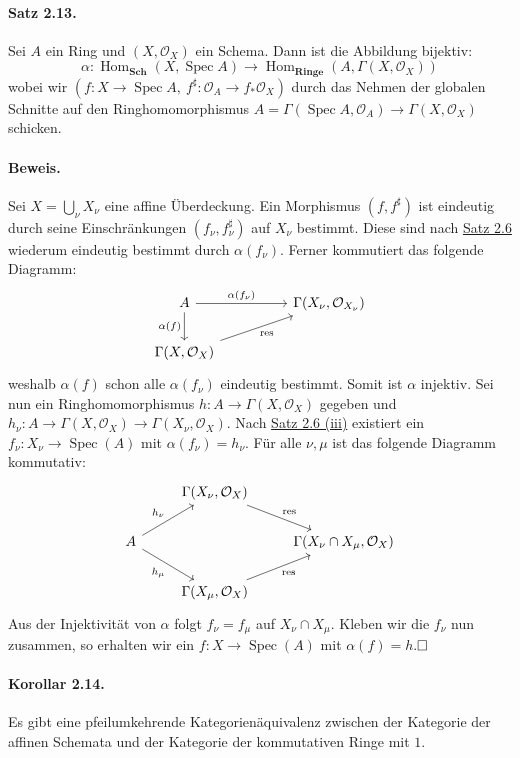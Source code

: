 \documentclass[11pt,b5paper,openany]{memoir}
\def \qed {$\hfill\square$}
\begin{document}
\paragraph{Satz 2.13.}\label{2.13} Sei $A$ ein Ring und $(X,\mathcal{O}_X)$ ein Schema. Dann ist die Abbildung bijektiv:
\[\alpha:\operatorname{Hom}_\mathbf{Sch}(X,\operatorname{Spec}A)\to \operatorname{Hom}_\textbf{Ringe}(A,\Gamma(X,\mathcal{O}_X)) \]
wobei wir $(f:X\to\operatorname{Spec}A ,\ f^\sharp:\mathcal{O}_A\to f_\ast\mathcal{O}_X)$ durch das Nehmen der globalen Schnitte auf den Ringhomomorphismus $A=\Gamma(\operatorname{Spec}A,\mathcal{O}_A)\to\Gamma(X,\mathcal{O}_X)$ schicken.

\paragraph{Beweis.} Sei $X=\bigcup_\nu X_\nu$ eine affine Überdeckung. Ein Morphismus $(f,f^\sharp)$ ist eindeutig durch seine Einschränkungen $(f_\nu,f_\nu^\sharp)$ auf $X_\nu$ bestimmt. Diese sind nach \hyperref[2.6]{Satz 2.6} wiederum eindeutig bestimmt durch $\alpha(f_\nu)$. Ferner kommutiert das folgende Diagramm:
\[\begin{tikzcd}
A\ar[d, "\alpha(f)"']\ar[rr, "\alpha(f_\nu)"] && \Gamma(X_\nu,\mathcal{O}_{X_\nu})\\
\Gamma(X,\mathcal{O}_X)\ar[rru, "\operatorname{res}"']
\end{tikzcd} \]
weshalb $\alpha(f)$ schon alle $\alpha(f_\nu)$ eindeutig bestimmt. Somit ist $\alpha$ injektiv. Sei nun ein Ringhomomorphismus $h:A\to\Gamma(X,\mathcal{O}_X)$ gegeben und $h_\nu:A\to\Gamma(X,\mathcal{O}_X)\to\Gamma(X_\nu,\mathcal{O}_X)$. Nach \hyperref[2.6]{Satz 2.6 (iii)} existiert ein $f_\nu:X_\nu\to\operatorname{Spec}(A)$ mit $\alpha(f_\nu)=h_\nu$. Für alle $\nu,\mu$ ist das folgende Diagramm kommutativ:
\[\begin{tikzcd}
& \Gamma(X_\nu,\mathcal{O}_X)\ar[dr, "\operatorname{res}"] &\\
A\ar[ur, "h_\nu"] \ar[dr, "h_\mu"'] & & \Gamma(X_\nu\cap X_\mu,\mathcal{O}_X)\\
& \Gamma(X_\mu,\mathcal{O}_X)\ar[ur, "\operatorname{res}"'] &
\end{tikzcd} \]
Aus der Injektivität von $\alpha$ folgt $f_\nu=f_\mu$ auf $X_\nu\cap X_\mu$. Kleben wir die $f_\nu$ nun zusammen, so erhalten wir ein $f:X\to\operatorname{Spec}(A)$ mit $\alpha(f)=h$.\qed 

\paragraph{Korollar 2.14.}\label{2.14} Es gibt eine pfeilumkehrende Kategorienäquivalenz zwischen der Kategorie der affinen Schemata und der Kategorie der kommutativen Ringe mit $1$.
\end{document}
